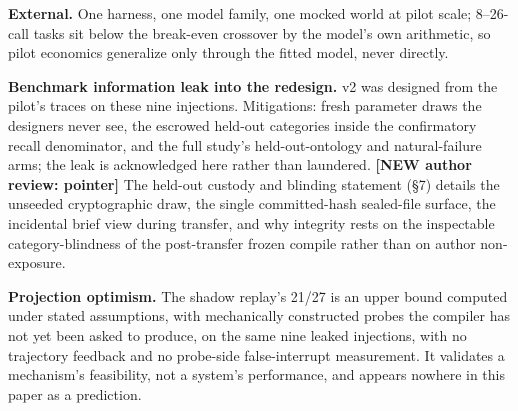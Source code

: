 \documentclass[acmsmall,screen,review,anonymous]{acmart}
\begin{document}
\textbf{External.} One harness, one model family, one mocked world at pilot scale; 8--26-call tasks sit below the break-even crossover by the model's own arithmetic, so pilot economics generalize only through the fitted model, never directly.

\textbf{Benchmark information leak into the redesign.} v2 was designed from the pilot's traces on these nine injections. Mitigations: fresh parameter draws the designers never see, the escrowed held-out categories inside the confirmatory recall denominator, and the full study's held-out-ontology and natural-failure arms; the leak is acknowledged here rather than laundered. \textbf{[NEW \textperiodcentered{} author review: pointer]} The held-out custody and blinding statement (\S7) details the unseeded cryptographic draw, the single committed-hash sealed-file surface, the incidental brief view during transfer, and why integrity rests on the inspectable category-blindness of the post-transfer frozen compile rather than on author non-exposure.

\textbf{Projection optimism.} The shadow replay's 21/27 is an upper bound computed under stated assumptions, with mechanically constructed probes the compiler has not yet been asked to produce, on the same nine leaked injections, with no trajectory feedback and no probe-side false-interrupt measurement. It validates a mechanism's feasibility, not a system's performance, and appears nowhere in this paper as a prediction.
\end{document}
